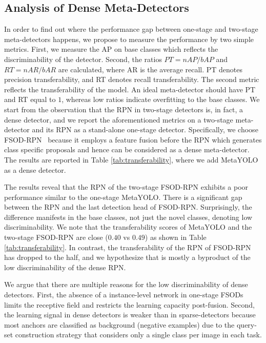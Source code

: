 \documentclass[10pt,twocolumn,letterpaper]{article}
\begin{document}
\subsection{Analysis of Dense Meta-Detectors}
In order to find out where the performance gap between one-stage and two-stage meta-detectors happens, we propose to measure the performance by two simple metrics. First, we measure the AP on base classes which reflects the discriminability of the detector. Second, the ratios $PT = nAP / bAP$ and $RT=nAR / bAR$ are calculated, where AR is the average recall. PT denotes precision transferability, and RT denotes recall transferability. The second metric reflects the transferability of the model. An ideal meta-detector should have PT and RT equal to $1$, whereas low ratios indicate overfitting to the base classes. We start from the observation that the RPN in two-stage detectors is, in fact, a dense detector, and we report the aforementioned metrics on a two-stage meta-detector and its RPN as a stand-alone one-stage detector. Specifically, we choose FSOD-RPN~\cite{FSOD-RPN} because it employs a feature fusion before the RPN which generates class specific proposals and hence can be considered as a dense meta-detector. The results are reported in Table \ref{tab:transferability}, where we add MetaYOLO~\cite{FSRW} as a dense detector.  


The results reveal that the RPN of the two-stage FSOD-RPN exhibits a poor performance similar to the one-stage MetaYOLO. There is a significant gap between the RPN and the last detection head of FSOD-RPN. Surprisingly, the difference manifests in the base classes, not just the novel classes, denoting low discriminability. We note that the transferability scores of MetaYOLO and the two-stage FSOD-RPN are close ($0.40$ vs $0.49$) as shown in Table \ref{tab:transferability}. In contrast, the transferability of the RPN of FSOD-RPN has dropped to the half, and we hypothesize that is mostly a byproduct of the low discriminability of the dense RPN.

We argue that there are multiple reasons for the low discriminability of dense detectors. First, the absence of a instance-level network in one-stage FSODs limits the receptive field and restricts the learning capacity post-fusion. Second, the learning signal in dense detectors is weaker than in sparse-detectors because most anchors are classified as background (negative examples) due to the query-set construction strategy that considers only a single class per image in each task. 
\end{document}
